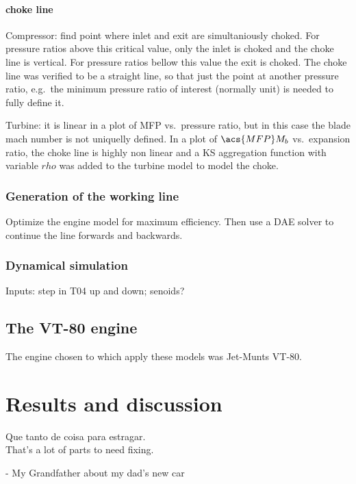 \documentclass[tcc]{subfiles}
\begin{document}
\subsubsection*{choke line}
Compressor: find point where inlet and exit are simultaniously choked. For pressure ratios above this critical value, only the inlet is choked and the choke line is vertical. For pressure ratios bellow this value the exit is choked. The choke line was verified to be a straight line, so that just the point at another pressure ratio, e.g.\ the minimum pressure ratio of interest (normally unit) is needed to fully define it.

Turbine: it is linear in a plot of \acs{MFP} vs.\ pressure ratio, but in this case the blade mach number is not uniquelly defined. In a plot of $\acs{MFP}M_b$ vs.\ expansion ratio, the choke line is highly non linear and a KS aggregation function with variable $rho$ was added to the turbine model to model the choke.  

\subsection{Generation of the working line}
Optimize the engine model for maximum efficiency. 
Then use a \ac{DAE} solver to continue the line forwards and backwards.

\subsection{Dynamical simulation}
Inputs: step in T04 up and down; senoids?

\section{The VT-80 engine}
The engine chosen to which apply these models was Jet-Munts VT-80.

\chapter{Results and discussion}
\epigraph{Que tanto de coisa para estragar.\\{\footnotesize That's a lot of parts to need fixing.}}{- My Grandfather about my dad's new car}
\end{document}
